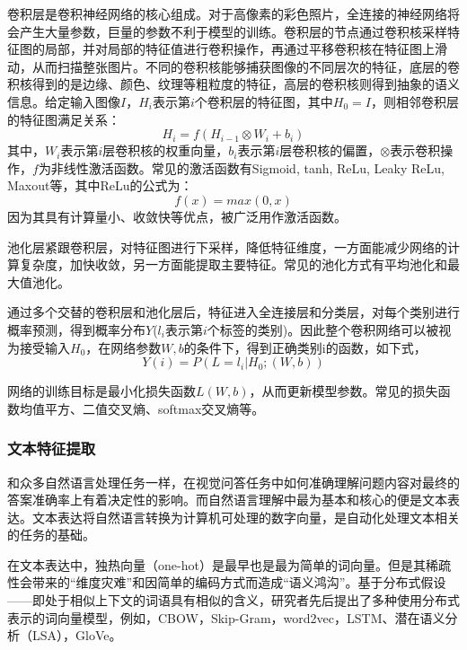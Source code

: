 卷积层是卷积神经网络的核心组成。对于高像素的彩色照片，全连接的神经网络将会产生大量参数，巨量的参数不利于模型的训练。卷积层的节点通过卷积核采样特征图的局部，并对局部的特征值进行卷积操作，再通过平移卷积核在特征图上滑动，从而扫描整张图片。不同的卷积核能够捕获图像的不同层次的特征，底层的卷积核得到的是边缘、颜色、纹理等粗粒度的特征，高层的卷积核则得到抽象的语义信息。给定输入图像$I$，$H_i$表示第$i$个卷积层的特征图，其中$H_0=I$，则相邻卷积层的特征图满足关系：
\begin{equation}
H_i = f(H_{i-1}\otimes W_i + b_i)
\end{equation}
其中，$W_i$表示第$i$层卷积核的权重向量，$b_i$表示第$i$层卷积核的偏置，$\otimes$表示卷积操作，$f$为非线性激活函数。常见的激活函数有Sigmoid, tanh, ReLu, Leaky ReLu, Maxout等，其中ReLu的公式为：
\begin{equation}
f(x) = max(0,x)
\end{equation}
因为其具有计算量小、收敛快等优点，被广泛用作激活函数。

池化层紧跟卷积层，对特征图进行下采样，降低特征维度，一方面能减少网络的计算复杂度，加快收敛，另一方面能提取主要特征。常见的池化方式有平均池化和最大值池化。

通过多个交替的卷积层和池化层后，特征进入全连接层和分类层，对每个类别进行概率预测，得到概率分布$Y$($l_i$表示第$i$个标签的类别)。因此整个卷积网络可以被视为接受输入$H_0$，在网络参数$W, b$的条件下，得到正确类别i的函数，如下式，
\begin{equation}
Y(i)=P(L=l_i | H_0; (W, b))
\end{equation}

网络的训练目标是最小化损失函数$L(W, b)$，从而更新模型参数。常见的损失函数均值平方、二值交叉熵、softmax交叉熵等。

\subsubsection{文本特征提取}
和众多自然语言处理任务一样，在视觉问答任务中如何准确理解问题内容对最终的答案准确率上有着决定性的影响。而自然语言理解中最为基本和核心的便是文本表达。文本表达将自然语言转换为计算机可处理的数字向量，是自动化处理文本相关的任务的基础。

在文本表达中，独热向量（one-hot）是最早也是最为简单的词向量。但是其稀疏性会带来的“维度灾难”和因简单的编码方式而造成“语义鸿沟”。基于分布式假设——即处于相似上下文的词语具有相似的含义，研究者先后提出了多种使用分布式表示的词向量模型，例如，CBOW，Skip-Gram，word2vec，LSTM、潜在语义分析（LSA），GloVe。

